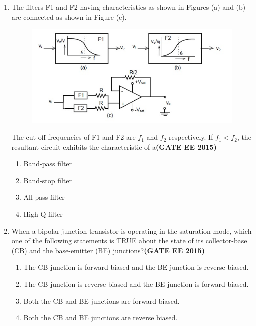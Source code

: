 \documentclass[a4paper,12pt]{exam}
\theoremstyle{remark}
\begin{document}
\begin{enumerate}
\item The filters F1 and F2 having characteristics as shown in Figures (a) and (b) are connected as shown in Figure (c). 
\begin{figure}[H]
    \centering
    \includegraphics[width=0.75\columnwidth]{figs/2Q 24.png}
    \caption{}
    \label{fig:placeholder}
\end{figure}
The cut-off frequencies of F1 and F2 are $f_1$ and $f_2$ respectively. If $f_1 < f_2$, the resultant circuit exhibits the characteristic of a\hfill{\textbf{(GATE EE 2015)}}
\begin{multicols}{2}
\begin{enumerate}
    \item Band-pass filter
    \item Band-stop filter
    \item All pass filter
    \item High-Q filter
\end{enumerate}
\end{multicols}

\item When a bipolar junction transistor is operating in the saturation mode, which one of the following statements is TRUE about the state of its collector-base (CB) and the base-emitter (BE) junctions?\hfill{\textbf{(GATE EE 2015)}}

\begin{enumerate}
    \item The CB junction is forward biased and the BE junction is reverse biased.
    \item The CB junction is reverse biased and the BE junction is forward biased.
    \item Both the CB and BE junctions are forward biased.
    \item Both the CB and BE junctions are reverse biased.
\end{enumerate}


\end{enumerate}
\end{document}
